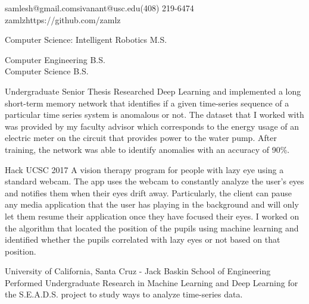 \documentclass{resume}
\begin{document}
{samlesh@gmail.com}{sivanant@usc.edu}{(408) 219-6474}
{zamlz}{https://github.com/zamlz}


Computer Science: Intelligent Robotics M.S.

Computer Engineering B.S. \\ Computer Science B.S.


{Undergraduate Senior Thesis}
{Researched Deep Learning and implemented a long short-term memory
network that identifies if a given time-series sequence of a particular
time series system is anomalous or not. The dataset that I worked with
was provided by my faculty advisor which corresponds to the energy usage
of an electric meter on the circuit that provides power to the water
pump. After training, the network was able to identify anomalies with
an accuracy of 90\%.}

{Hack UCSC 2017}
{A vision therapy program for people with lazy eye using a standard 
webcam. The app uses the webcam to constantly analyze the user's eyes 
and notifies them when their eyes drift away. Particularly, the client
can pause any media application that the user has playing in the 
background and will only let them resume their application once they 
have focused their eyes. I worked on the algorithm that located the
position of the pupils using machine learning and identified whether
the pupils correlated with lazy eyes or not based on that position.}


{University of California, Santa Cruz - Jack Baskin School of Engineering}
{Performed Undergraduate Research in Machine Learning and Deep Learning 
for the S.E.A.D.S. project to study ways to analyze time-series data.}
\end{document}
